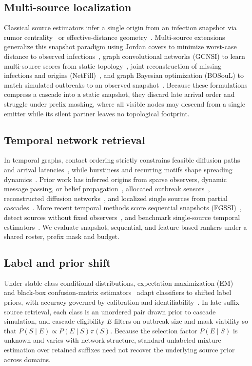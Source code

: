 \documentclass[a4paper,runningheads]{llncs}
\begin{document}
\subsection{Multi-source localization}
Classical source estimators infer a single origin from an infection snapshot via rumor centrality~\cite{shah} or effective-distance geometry~\cite{brock}. Multi-source extensions generalize this snapshot paradigm using Jordan covers to minimize worst-case distance to observed infections~\cite{zhu}, graph convolutional networks (GCNSI) to learn multi-source scores from static topology~\cite{gcnsi}, joint reconstruction of missing infections and origins (NetFill)~\cite{netfill}, and graph Bayesian optimization (BOSouL) to match simulated outbreaks to an observed snapshot~\cite{bosoul}. Because these formulations compress a cascade into a static snapshot, they discard late arrival order and struggle under prefix masking, where all visible nodes may descend from a single emitter while its silent partner leaves no topological footprint.

\subsection{Temporal network retrieval}
In temporal graphs, contact ordering strictly constrains feasible diffusion paths and arrival latencies~\cite{holme,kempe_j,koss}, while burstiness and recurring motifs shape spreading dynamics~\cite{karsai,blog,college,motifs}. Prior work has inferred origins from sparse observers, dynamic message passing, or belief propagation~\cite{altarelli,lokhov,pinto}, allocated outbreak sensors~\cite{outbreak}, reconstructed diffusion networks~\cite{netinf}, and localized single sources from partial cascades~\cite{farajtabar}. More recent temporal methods score sequential snapshots (FGSSI)~\cite{fgssi}, detect sources without fixed observers~\cite{nhtd}, and benchmark single-source temporal estimators~\cite{brack}. We evaluate snapshot, sequential, and feature-based rankers under a shared roster, prefix mask and budget.

\subsection{Label and prior shift}
Under stable class-conditional distributions, expectation maximization (EM)~\cite{saerens} and black-box confusion-matrix estimators~\cite{lipton} adapt classifiers to shifted label priors, with accuracy governed by calibration and identifiability~\cite{alex,garg,guo}. In late-suffix source retrieval, each class is an unordered pair drawn prior to cascade simulation, and cascade eligibility $E$ filters on outbreak size and mask viability so that $P(S\mid E)\propto P(E\mid S)\pi(S)$. Because the selection factor $P(E\mid S)$ is unknown and varies with network structure, standard unlabeled mixture estimation over retained suffixes need not recover the underlying source prior across domains.
\end{document}
